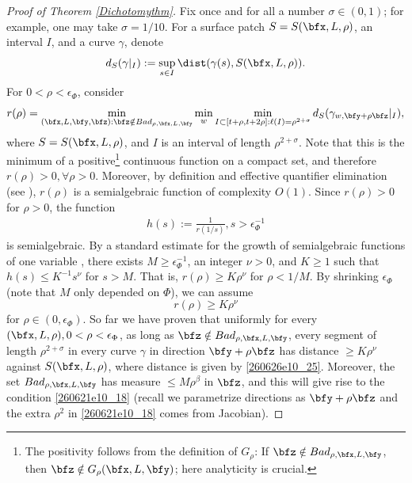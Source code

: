 \documentclass{article}
\numberwithin{equation}{section}
\theoremstyle{plain}
\begin{document}
\begin{proof}[Proof of Theorem \ref{Dichotomythm}]
Fix once and for all a number $\sigma\in (0, 1)$; for example, one may take $\sigma=1/10.$ For a surface patch $S=S(\bfx, L, \rho)$, an interval $I$, and a curve $\gamma$, denote 
\begin{equation}\label{260626e10_25}
    d_S(\gamma|_I):=\sup_{s\in I} \dist(\gamma(s), S(\bfx, L, \rho)).  
\end{equation}
For $0<\rho< \epsilon_{\Phi}$, consider \begin{equation}
    r(\rho) = \min_{(\bfx, L, \bfy, \bfz): \bfz \notin Bad_{\rho, \bfx, L, \bfy}} \min_{w} \min_{I\subset [t+\rho, t+2\rho]: \ell(I)=\rho^{2+\sigma}} d_S(\gamma_{w, \bfy+ \rho\bfz}|_I),
\end{equation}
where $S=S(\bfx, L, \rho)$, and $I$ is an interval of length $\rho^{2+\sigma}$. Note that this is the minimum of a positive\footnote{The positivity follows from the definition of $G_{\rho}$: If $\bfz\notin Bad_{\rho, \bfx, L, \bfy}$, then $\bfz \notin G_{\rho}(\bfx, L, \bfy)$; here analyticity is crucial. } continuous function on a compact set, and therefore $r(\rho)>0, \forall \rho>0$. Moreover, by definition and effective quantifier elimination (see \cite{basu2006algorithms}), $r(\rho)$ is a semialgebraic function of complexity $O(1)$. Since $r(\rho) > 0$ for $\rho > 0$, the function 
\begin{align}
    h(s) := \frac{1}{r(1/s)}, s > \epsilon_\Phi^{-1}
\end{align}
is semialgebraic. By a standard estimate for the growth of semialgebraic functions of one variable \cite[Proposition 2.11]{Coste2002SemialgebraicGeometry}, there exists $M \geq \epsilon_\Phi^{-1}$, an integer $\nu >0$, and $K \geq 1$ such that $h(s) \leq K^{-1}s^\nu$ for $s > M$. That is, $r(\rho) \geq K\rho^\nu$ for $\rho < 1/M$. By shrinking $\epsilon_\Phi$ (note that $M$ only depended on $\Phi$), we can assume 
\begin{equation}
    r(\rho)\geq K\rho^{\nu}
\end{equation}
for $\rho \in (0,\epsilon_\Phi)$. 
So far we have proven that uniformly for every $(\bfx, L, \rho), 0<\rho< \epsilon_{\Phi}$, as long as $\bfz \notin Bad_{\rho, \bfx, L, \bfy}$, every segment of length $\rho^{2+\sigma}$ in every curve $\gamma$ in direction $\bfy+ \rho \bfz$ has  distance $\geq K\rho^{\nu}$ against $S(\bfx, L, \rho)$, where distance is given by \eqref{260626e10_25}. Moreover, 
the set $Bad_{\rho, \bfx, L, \bfy}$ has measure $\leq M\rho^{\beta}$ in $\bfz$, and this will give rise to the condition \eqref{260621e10_18} (recall we parametrize directions as $\bfy+ \rho \bfz$ and the extra $\rho^2$ in \eqref{260621e10_18} comes from Jacobian). 

\end{proof}
\end{document}
